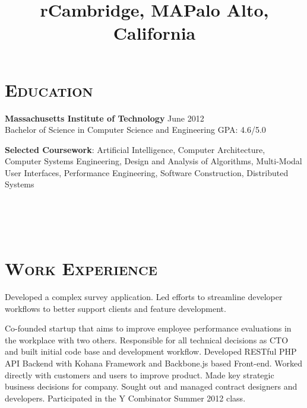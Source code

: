 \begin{resume}


\section{\textsc{Education}}

\textbf{Massachusetts Institute of Technology} \hfill{June 2012}\\
Bachelor of Science in Computer Science and Engineering \hfill{GPA: 4.6/5.0} 

\textbf{Selected Coursework}: Artificial Intelligence, Computer Architecture, Computer Systems Engineering, Design and Analysis of Algorithms, Multi-Modal User Interfaces, Performance Engineering, Software Construction, Distributed Systems



\begin{formatb}
  \title{r}\\
  \\
  \body\\
\end{formatb}

\section{\textsc{Work Experience}}

\title{Cambridge, MA}
\begin{position}
Developed a complex survey application. Led efforts to streamline developer workflows to better support clients and feature development.
\end{position}

\title{Palo Alto, California}
\begin{position}
Co-founded startup that aims to improve employee performance evaluations in the workplace with two others. Responsible for all technical decisions as CTO and built initial code base and development workflow. Developed RESTful PHP API Backend with Kohana Framework and Backbone.js based Front-end. Worked directly with customers and users to improve product. Made key strategic business decisions for company. Sought out and managed contract designers and developers. Participated in the Y Combinator Summer 2012 class.
\end{position}


\end{resume}
